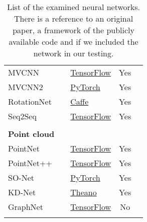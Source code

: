 \begin{table}[]
\begin{tabular}{lllcc}
		MVCNN                  & \cite{su_multi-view_2015}                & \href{https://github.com/WeiTang114/MVCNN-TensorFlow}{TensorFlow}                      &     Yes     &  \\
		MVCNN2                 & \cite{su_deeper_2018}                    & \href{https://github.com/jongchyisu/mvcnn_pytorch}{PyTorch}                            &     Yes     &  \\
		RotationNet            & \cite{kanezaki_rotationnet:_2018}        & \href{https://github.com/kanezaki/rotationnet}{Caffe}                                  &     Yes     &  \\
		Seq2Seq                & \cite{zhizhong_seqviews2seqlabels:_2018} & \href{https://github.com/mingyangShang/SeqViews2SeqLabels}{TensorFlow}                 &     Yes     &  \\
		                       &                                          &                                                                                        &             &  \\
		\textbf{Point cloud  } &                                          &                                                                                        &             &  \\
		PointNet               & \cite{qi_pointnet:_2016}                 & \href{https://github.com/charlesq34/pointnet}{TensorFlow}                              &     Yes     &  \\
		PointNet++             & \cite{qi_pointnet++:_2017}               & \href{https://github.com/charlesq34/pointnet2}{TensorFlow}                             &     Yes     &  \\
		SO-Net                 & \cite{li_so-net:_2018}                   & \href{https://github.com/lijx10/SO-Net}{PyTorch}                                       &     Yes     &  \\
		KD-Net                 & \cite{klokov_escape_2017}                & \href{https://github.com/Regenerator/kdnets}{Theano}                                   &     Yes     &  \\
		GraphNet               & \cite{dominguez_general-purpose_2018}    & \href{https://github.com/WDot/G3DNet}{TensorFlow}                                      &     No      &  \\
		                       &                                          &                                                                                        &             &  \\ \hline
	\end{tabular}
\caption{List of the examined neural networks. There is a reference to an original paper, a framework of the publicly available code and if we included the network in our testing.}
\label{Table:1}
\end{table}